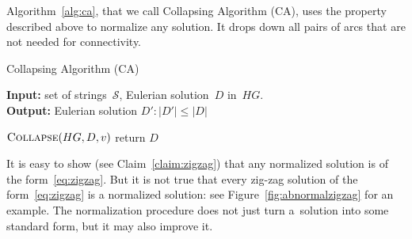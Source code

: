 Algorithm~\ref{alg:ca}, that we call Collapsing Algorithm (CA), uses the property described above to normalize any solution.
It drops down all pairs of arcs that are not needed for connectivity.



\begin{algorithm}[!ht]
\caption{Collapsing Algorithm (CA)}
\label{alg:ca}
\hspace*{\algorithmicindent} \textbf{Input:} set of strings~$\mathcal{S}$, Eulerian solution~$D$ in~$HG$.\\
\hspace*{\algorithmicindent} \textbf{Output:} Eulerian solution $D'\colon |D'|\leq|D|$
\begin{algorithmic}[1]
\label{alg:ca_for}
\State $\text{\sc Collapse}(HG, D, v)$
\EndWhile
\EndFor
\EndFor
\State return $D$
\end{algorithmic}
\end{algorithm}

It is easy to show (see Claim~\ref{claim:zigzag}) that any normalized solution is of the form~\eqref{eq:zigzag}. But it is not true that every zig-zag solution of the form~\eqref{eq:zigzag} is a normalized solution: see Figure~\ref{fig:abnormalzigzag} for an example. The normalization procedure does not just turn a~solution into some standard form, but it may also improve it.


